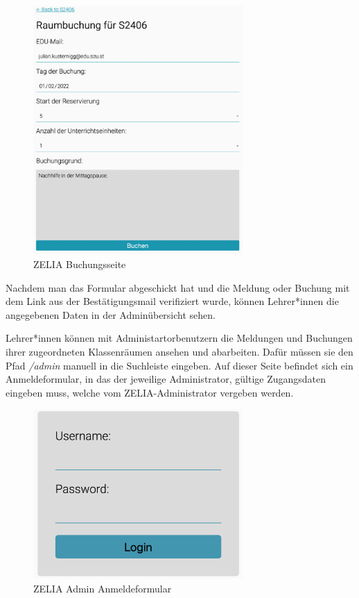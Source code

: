 \begin{figure}[H]
    \centering
    \includegraphics[width=80mm]{media/WebComponents/Buchungsseite_light.png}
    \caption{ZELIA Buchungsseite}
\end{figure}

Nachdem man das Formular abgeschickt hat und die Meldung oder Buchung mit dem Link aus der Bestätigungsmail verifiziert wurde, können Lehrer*innen die angegebenen Daten in der Adminübersicht sehen.


Lehrer*innen können mit Administartorbenutzern die Meldungen und Buchungen ihrer zugeordneten Klassenräumen ansehen und abarbeiten. Dafür müssen sie den Pfad \emph{/admin} manuell in die Suchleiste eingeben. Auf dieser Seite befindet sich ein Anmeldeformular, in das der jeweilige Administrator, gültige Zugangsdaten eingeben muss, welche vom ZELIA-Administrator vergeben werden. 

\begin{figure}[H]
    \centering
    \includegraphics[width=80mm]{media/WebComponents/Login_light.png}
    \caption{ZELIA Admin Anmeldeformular}
\end{figure}

